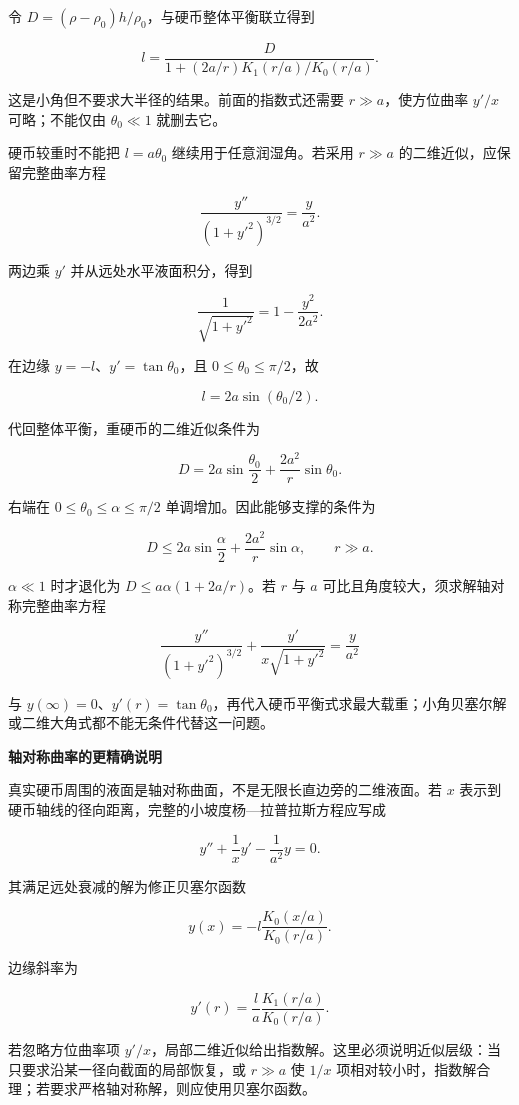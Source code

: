 \documentclass[12pt,a4paper,UTF8]{ctexart}
\begin{document}
令 \(D=(\rho-\rho_0)h/\rho_0\)，与硬币整体平衡联立得到

\[\boxed{l=\frac D{1+(2a/r)K_1(r/a)/K_0(r/a)}}.\]

这是小角但不要求大半径的结果。前面的指数式还需要 \(r\gg a\)，使方位曲率
\(y'/x\) 可略；不能仅由 \(\theta_0\ll1\) 就删去它。

硬币较重时不能把 \(l=a\theta_0\) 继续用于任意润湿角。若采用 \(r\gg a\)
的二维近似，应保留完整曲率方程

\[\frac{y''}{(1+y'^2)^{3/2}}=\frac y{a^2}.\]

两边乘 \(y'\) 并从远处水平液面积分，得到

\[\frac1{\sqrt{1+y'^2}}=1-\frac{y^2}{2a^2}.\]

在边缘 \(y=-l\)、\(y'=\tan\theta_0\)，且 \(0\le\theta_0\le\pi/2\)，故

\[\boxed{l=2a\sin(\theta_0/2)}.\]

代回整体平衡，重硬币的二维近似条件为

\[D=2a\sin\frac{\theta_0}2+\frac{2a^2}r\sin\theta_0.\]

右端在 \(0\le\theta_0\le\alpha\le\pi/2\) 单调增加。因此能够支撑的条件为

\[\boxed{D\le2a\sin\frac\alpha2+\frac{2a^2}r\sin\alpha},\qquad r\gg a.\]

\(\alpha\ll1\) 时才退化为 \(D\le a\alpha(1+2a/r)\)。若 \(r\) 与 \(a\)
可比且角度较大，须求解轴对称完整曲率方程

\[\frac{y''}{(1+y'^2)^{3/2}}+
\frac{y'}{x\sqrt{1+y'^2}}=\frac y{a^2}\]

与
\(y(\infty)=0\)、\(y'(r)=\tan\theta_0\)，再代入硬币平衡式求最大载重；小角贝塞尔解或二维大角式都不能无条件代替这一问题。

\textbf{轴对称曲率的更精确说明}

真实硬币周围的液面是轴对称曲面，不是无限长直边旁的二维液面。若 \(x\)
表示到硬币轴线的径向距离，完整的小坡度杨---拉普拉斯方程应写成

\[
y''+\frac1x y'-\frac1{a^2}y=0.
\]

其满足远处衰减的解为修正贝塞尔函数

\[
y(x)=-l\frac{K_0(x/a)}{K_0(r/a)}.
\]

边缘斜率为

\[
y'(r)=\frac la\frac{K_1(r/a)}{K_0(r/a)}.
\]

若忽略方位曲率项
\(y'/x\)，局部二维近似给出指数解。这里必须说明近似层级：当只要求沿某一径向截面的局部恢复，或
\(r\gg a\) 使 \(1/x\)
项相对较小时，指数解合理；若要求严格轴对称解，则应使用贝塞尔函数。
\end{document}
